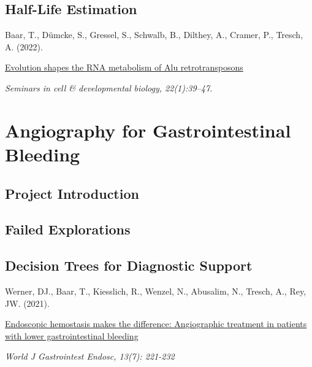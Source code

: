 \section{Half-Life Estimation}

\begin{tcolorbox}[
  boxrule=0pt, leftrule=1pt, colframe=s-blue, colback=white, sharp corners=all]%
  \raggedright
  Baar, T., Dümcke, S., Gressel, S., Schwalb, B.,
  Dilthey, A., Cramer, P., Tresch, A. (2022).
  
  \smallskip
  \href{http://www.overleaf.com}
    {Evolution shapes the RNA metabolism of Alu retrotransposons}

  \smallskip
  \textit{Seminars in cell \& developmental biology, 22(1):39–47.}
\end{tcolorbox}


\chapter{Angiography for Gastrointestinal Bleeding}

\section{Project Introduction}

\section{Failed Explorations}

\section{Decision Trees for Diagnostic Support}

\begin{tcolorbox}[
  boxrule=0pt, leftrule=1pt, colframe=s-blue, colback=white, sharp corners=all]%
  \raggedright
  Werner, DJ., Baar, T., Kiesslich, R., Wenzel, N., Abusalim, N., Tresch, A.,
  Rey, JW. (2021).
  
  \smallskip
  \href{https://www.wjgnet.com/1948-5190/full/v13/i7/221.htm}
    {Endoscopic hemostasis makes the difference: Angiographic treatment in
    patients with lower gastrointestinal bleeding}

  \smallskip
  \textit{World J Gastrointest Endosc, 13(7): 221-232}
\end{tcolorbox}

